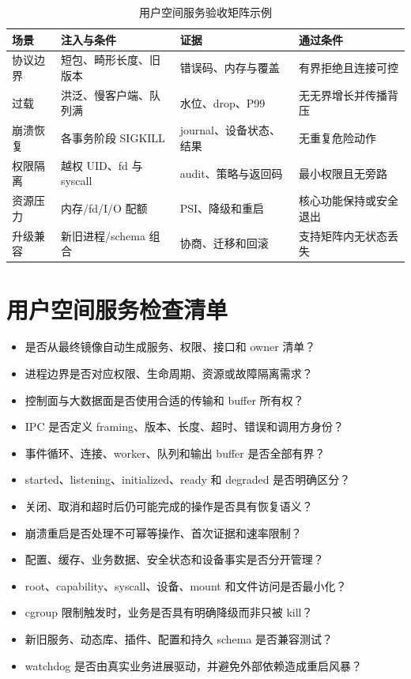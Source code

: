 \begin{table}[H]
  \centering
  \caption{用户空间服务验收矩阵示例}
  \begin{tabular}{p{29mm}p{42mm}p{38mm}p{31mm}}
    \hline
    场景 & 注入与条件 & 证据 & 通过条件 \\
    \hline
    协议边界 & 短包、畸形长度、旧版本 & 错误码、内存与覆盖 & 有界拒绝且连接可控 \\
    过载 & 洪泛、慢客户端、队列满 & 水位、drop、P99 & 无无界增长并传播背压 \\
    崩溃恢复 & 各事务阶段 SIGKILL & journal、设备状态、结果 & 无重复危险动作 \\
    权限隔离 & 越权 UID、fd 与 syscall & audit、策略与返回码 & 最小权限且无旁路 \\
    资源压力 & 内存/fd/I/O 配额 & PSI、降级和重启 & 核心功能保持或安全退出 \\
    升级兼容 & 新旧进程/schema 组合 & 协商、迁移和回滚 & 支持矩阵内无状态丢失 \\
    \hline
  \end{tabular}
\end{table}

\section{用户空间服务检查清单}

\begin{itemize}
  \item 是否从最终镜像自动生成服务、权限、接口和 owner 清单？
  \item 进程边界是否对应权限、生命周期、资源或故障隔离需求？
  \item 控制面与大数据面是否使用合适的传输和 buffer 所有权？
  \item IPC 是否定义 framing、版本、长度、超时、错误和调用方身份？
  \item 事件循环、连接、worker、队列和输出 buffer 是否全部有界？
  \item started、listening、initialized、ready 和 degraded 是否明确区分？
  \item 关闭、取消和超时后仍可能完成的操作是否具有恢复语义？
  \item 崩溃重启是否处理不可幂等操作、首次证据和速率限制？
  \item 配置、缓存、业务数据、安全状态和设备事实是否分开管理？
  \item root、capability、syscall、设备、mount 和文件访问是否最小化？
  \item cgroup 限制触发时，业务是否具有明确降级而非只被 kill？
  \item 新旧服务、动态库、插件、配置和持久 schema 是否兼容测试？
  \item watchdog 是否由真实业务进展驱动，并避免外部依赖造成重启风暴？
\end{itemize}
